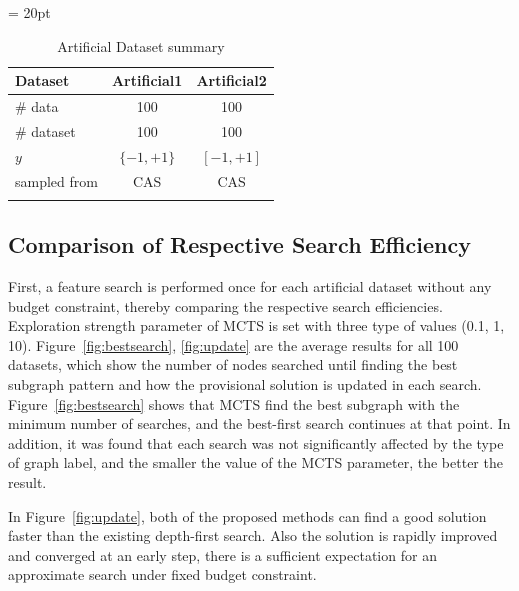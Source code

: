 \tabcolsep = 20pt
\begin{table}[h]
  \centering
  \caption{Artificial Dataset summary}
  \label{tbl:artificial}
  	\begin{tabular}{lcc}
		\thickhline
		Dataset			& Artificial1           & Artificial2        \\  \hline
		\# data			& 100            		& 100          \\
		\# dataset		& 100     	 			& 100    	\\  
		$y$				& $\{-1, +1\}$     	 	& $[-1, +1]$    	\\  
		sampled from			& CAS     	 			& CAS    	\\  
		\thickhline
		\end{tabular}
\end{table}

\subsection{Comparison of Respective Search Efficiency}
First, a feature search is performed once for each artificial dataset without any budget constraint, 
thereby comparing the respective search efficiencies.
Exploration strength parameter of MCTS is set with three type of values (0.1, 1, 10).
Figure~\ref{fig:bestsearch}, \ref{fig:update} are the average results for all 100 datasets, 
which show the number of nodes searched until finding the best subgraph pattern 
and how the provisional solution is updated in each search.
Figure~\ref{fig:bestsearch} shows that MCTS find the best subgraph with the minimum number of searches, 
and the best-first search continues at that point.
In addition, it was found that each search was not significantly affected by the type of graph label, 
and the smaller the value of the MCTS parameter, the better the result.

In Figure~\ref{fig:update}, both of the proposed methods 
can find a good solution faster than the existing depth-first search.
Also the solution is rapidly improved and converged at an early step, 
there is a sufficient expectation for an approximate search under fixed budget constraint.

